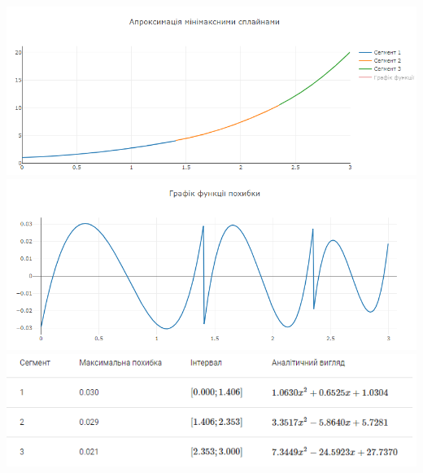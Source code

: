 \documentclass[ukrainian,14pt]{extarticle}
\begin{document}
\includegraphics[scale=0.8]{examples/4_approx.png}
\vspace{0.5cm}
\includegraphics[scale=0.8]{examples/4_error.png}
\vspace{0.5cm}
\includegraphics[scale=0.95]{examples/4_table.png}


\end{document}
